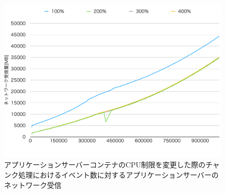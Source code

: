 \documentclass[../../../../../main]{subfiles}
\begin{document}
    \begin{figure}[H]
        \centering
        \includegraphics[width=12cm]{graph}
        \caption{アプリケーションサーバーコンテナのCPU制限を変更した際のチャンク処理におけるイベント数に対するアプリケーションサーバーのネットワーク受信}
        \label{fig:stream-change-app-cpu-limit-app-net-in-app_1024-db_1_1024}
    \end{figure}
\end{document}

